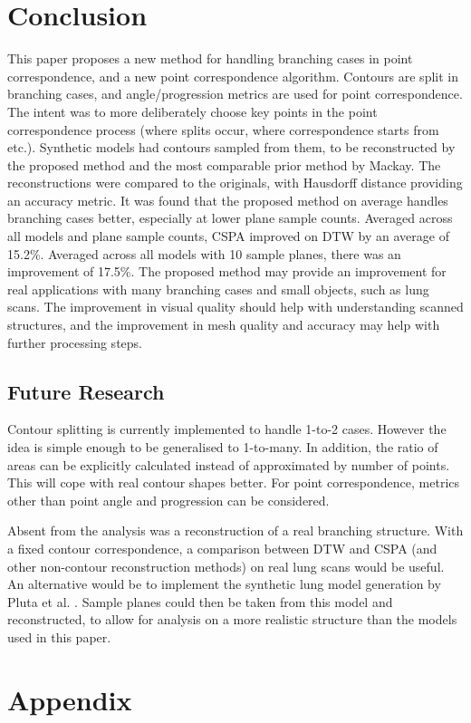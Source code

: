 \documentclass[11p, titlepage]{article}
\begin{document}
\section{Conclusion}

This paper proposes a new method for handling branching cases in point correspondence, and a new point correspondence algorithm. Contours are split in branching cases, and angle/progression metrics are used for point correspondence. The intent was to more deliberately choose key points in the point correspondence process (where splits occur, where correspondence starts from etc.). Synthetic models had contours sampled from them, to be reconstructed by the proposed method and the most comparable prior method by Mackay. The reconstructions were compared to the originals, with Hausdorff distance providing an accuracy metric. It was found that the proposed method on average handles branching cases better, especially at lower plane sample counts. Averaged across all models and plane sample counts, CSPA improved on DTW by an average of 15.2\%. Averaged across all models with 10 sample planes, there was an improvement of 17.5\%. The proposed method may provide an improvement for real applications with many branching cases and small objects, such as lung scans. The improvement in visual quality should help with understanding scanned structures, and the improvement in mesh quality and accuracy may help with further processing steps.

\subsection{Future Research}

Contour splitting is currently implemented to handle 1-to-2 cases. However the idea is simple enough to be generalised to 1-to-many. In addition, the ratio of areas can be explicitly calculated instead of approximated by number of points. This will cope with real contour shapes better. For point correspondence, metrics other than point angle and progression can be considered.

Absent from the analysis was a reconstruction of a real branching structure. With a fixed contour correspondence, a comparison between DTW and CSPA (and other non-contour reconstruction methods) on real lung scans would be useful. An alternative would be to implement the synthetic lung model generation by Pluta et al. \cite{pluta2012new}. Sample planes could then be taken from this model and reconstructed, to allow for analysis on a more realistic structure than the models used in this paper.

\pagebreak



\section{Appendix}
\end{document}
